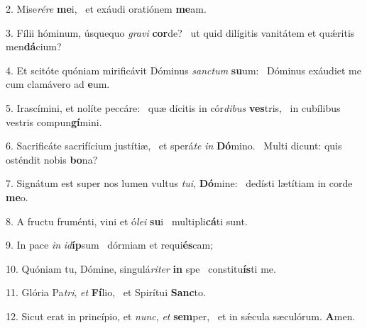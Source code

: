 2. Mise\textit{ré}\textit{re} \textbf{me}i, \ast\  et exáudi oratiónem \textbf{me}am.\

3. Fílii hóminum, úsquequo \textit{gra}\textit{vi} \textbf{cor}de? \ast\  ut quid dilígitis vanitátem et quǽritis men\textbf{dá}cium?\

4. Et scitóte quóniam mirificávit Dóminus \textit{sanc}\textit{tum} \textbf{su}um: \ast\  Dóminus exáudiet me cum clamávero ad \textbf{e}um.\

5. Irascímini, et nolíte peccáre: \dag\  quæ dícitis in cór\textit{di}\textit{bus} \textbf{ves}tris, \ast\  in cubílibus vestris compun\textbf{gí}mini.\

6. Sacrificáte sacrifícium justítiæ, \dag\  et sperá\textit{te} \textit{in} \textbf{Dó}mino. \ast\  Multi dicunt: quis osténdit nobis \textbf{bo}na?\

7. Signátum est super nos lumen vultus \textit{tu}\textit{i}, \textbf{Dó}mine: \ast\  dedísti lætítiam in corde \textbf{me}o.\

8. A fructu fruménti, vini et ó\textit{le}\textit{i} \textbf{su}i \ast\  multipli\textbf{cá}ti sunt.\

9. In pace \textit{in} \textit{id}\textbf{íp}sum \ast\  dórmiam et requi\textbf{és}cam;\

10. Quóniam tu, Dómine, singulá\textit{ri}\textit{ter} \textbf{in} spe \ast\  constitu\textbf{ís}ti me.\

11. Glória Pa\textit{tri}, \textit{et} \textbf{Fí}lio, \ast\  et Spirítui \textbf{Sanc}to.\

12. Sicut erat in princípio, et \textit{nunc}, \textit{et} \textbf{sem}per, \ast\  et in sǽcula sæculórum. \textbf{A}men.\

